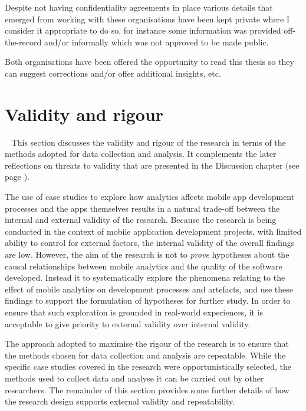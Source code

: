 Despite not having confidentiality agreements in place various details that emerged from working with these organisations have been kept private where I consider it appropriate to do so, for instance some information was provided off-the-record and/or informally which was not approved to be made public. 

Both organisations have been offered the opportunity to read this thesis so they can suggest corrections and/or offer additional insights, etc.


\section{Validity and rigour}~\label{methodology-threats-to-validity-section}
This section discusses the validity and rigour of the research in terms of the methods adopted for data collection and analysis. It complements the later reflections on threats to validity that are presented in the Discussion chapter (see page \pageref{discussion-threats-to-validity-section}).

The use of case studies to explore how analytics affects mobile app development processes and the apps themselves results in a natural trade-off between the internal and external validity of the research. Because the research is being conducted in the context of mobile application development projects, with limited ability to control for external factors, the internal validity of the overall findings are low. However, the aim of the research is not to \textit{prove} hypotheses about the causal  relationships between mobile analytics and the quality of the software developed.  Instead it to systematically explore the phenomena relating to the effect of mobile analytics on development processes and artefacts, and use these findings to support the formulation of hypotheses for further study. In order to ensure that such exploration is grounded in real-world experiences, it is acceptable to give priority to  external validity over internal validity.

The approach adopted to maximise the rigour of the research is to ensure that the methods chosen for data collection and analysis are repeatable. While the specific case studies covered in the research were opportunistically selected, the methods used to collect data and analyse it can be carried out by other researchers. The remainder of this section provides some further details of how the research design supports external validity and repeatability.

